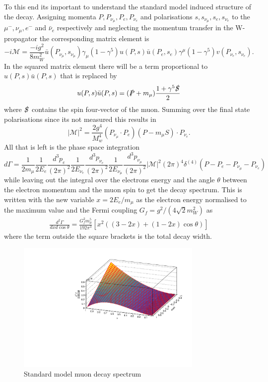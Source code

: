 To this end its important to understand the standard model induced structure of the decay. Assigning momenta $P,P_{\nu_\mu},P_e,P_{\nu_e}$ and polarisations $s,s_{\nu_\mu},s_e,s_{\nu_e}$ to the $\mu^-,\nu_\mu,e^-$ and $\bar{\nu}_e$ respectively
 and neglecting the momentum transfer in the W-propagator the corresponding matrix element is
 \begin{equation}
 -i\mathcal{M}=\frac{-ig^2}{8m_W^2}\bar{u}(P_{\nu_\mu},s_{\nu_\mu}) \gamma_\mu(1-\gamma^5)u(P,s)\bar{u}(P_e,s_e)\gamma^\mu(1-\gamma^5)v(P_{\nu_e},s_{\nu_e}).
 \end{equation}
In the squared matrix element there will be a term proportional to $u(P,s)\bar{u}(P,s)$ that is replaced by 
\begin{equation}
u(P,s)\bar{u}(P,s)=(\slashed{P}+m_\mu)\frac{1+\gamma^5\slashed{S}}{2}
\end{equation}
where $\slashed{S}$ contains the spin four-vector of the muon.
Summing over the final state polarisations since its not measured this results in
\begin{equation}
|\mathcal{M}|^2=\frac{2g^4}{M_w^4} (P_{\nu_\mu} \cdot P_e ) (P-m_\mu S)\cdot P_{\nu_e}.
\end{equation}
All that is left is the phase space integration
\begin{equation}
d\Gamma = \frac{1}{2m_\mu}\frac{1}{2E_e}\frac{d^3p_e}{(2\pi)^2}\frac{1}{2E_{\nu_e}}\frac{d^3p_{\nu_e}}{(2\pi)^2}\frac{1}{2E_{\nu_\mu}}\frac{d^3p_{\nu_\mu}}{(2\pi)^2}|\mathcal{M}|^2(2\pi)^4\delta^{(4)}(P-P_e-P_{\nu_\mu}-P_{\nu_e})
\end{equation}
 while leaving out the integral over the electrons energy and the angle $\theta$ between the electron momentum and the muon spin to get the decay spectrum. 
This is written with the new variable $x=2E_e/m_\mu$ as the electron energy normalised to the maximum value and the Fermi coupling $G_f=g^2/(4\sqrt{2}m_W^2)$ as
\begin{align}
\frac{d^2\Gamma}{dxd\cos\theta}=\frac{G_f^2m_\mu^5}{192\pi^3}\left[x^2\left((3-2x)+(1-2x)\cos\theta\right)\right]
\label{eq:DiffrateSimple}
\end{align}
where the term outside the square brackets is the total decay width.
\begin{figure}[H]
  \centering
    \includegraphics[width=0.8\textwidth]{imgs/MuonSpectrum}
    \caption{Standard model muon decay spectrum}
    \label{fg:SM-MuonSpectrum}
\end{figure}
